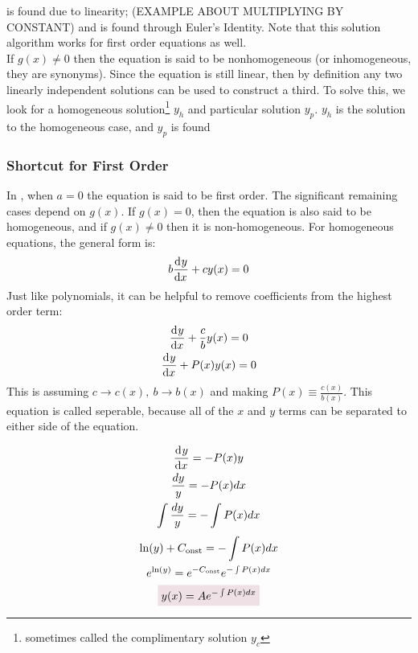          is found due to linearity; (EXAMPLE ABOUT MULTIPLYING BY CONSTANT) and  is found through Euler's Identity. Note that this solution algorithm works for first order equations as well.  
        \\[0.25cm]
        If $g(x)\neq0$ then the equation is said to be nonhomogeneous (or inhomogeneous, they are synonyms). Since the equation is still linear, then by definition any two linearly independent solutions can be used to construct a third. To solve this, we look for a homogeneous solution\footnote{sometimes called the complimentary solution $y_c$} $y_h$ and particular solution $y_p$. $y_h$ is the solution to the homogeneous case, and $y_p$ is found 
    \subsubsection{Shortcut for First Order}
        In , when $a=0$ the equation is said to be first order. The significant remaining cases depend on $g(x)$. If $g(x)=0$, then the equation is also said to be homogeneous, and if $g(x)\neq0$ then it is non-homogeneous. For homogeneous equations, the general form is:
        \begin{equation}
            b\der{y}{x}+cy(x)=0
        \end{equation}
        Just like polynomials, it can be helpful to remove coefficients from the highest order term:
        \begin{gather*}
            \der{y}{x}+\frac{c}{b}y(x)=0
            \\
            \der{y}{x}+P(x)y(x)=0
        \end{gather*}
        This is assuming $c\rightarrow c(x),~b\rightarrow b(x)$ and making $P(x)\equiv\frac{c(x)}{b(x)}$. This equation is called seperable, because all of the $x$ and $y$ terms can be separated to either side of the equation. 
        \begin{multicols}{2}\raggedcolumns
            {\length[0.25cm]
                \begin{gather*}
                    \der{y}{x}=-P(x)y
                    \\
                    \frac{dy}{y}=- P(x)dx
                    \\
                    \int\frac{dy}{y}=-\int P(x)dx
                \end{gather*}
            }   
            {\length[0.25cm]
                \begin{gather}
                \ln(y)+C_{\text{onst}}=-\int P(x)dx \notag
                \\
                e^{\ln(y)}=e^{-C_{\text{onst}}}e^{-\int P(x)dx} \notag
                \\
                \coloredanswer{y(x)=Ae^{-\int P(x)dx}}
            \end{gather}
            } 
        \end{multicols}
    \newpage
